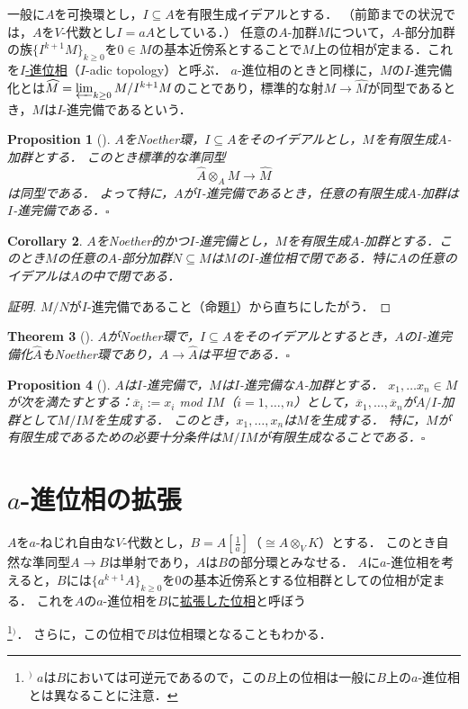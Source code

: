 \documentclass[a4paper,12pt, dvipdfmx]{jsbook}
\def\ovl#1{\overline{#1}}%
\theoremstyle{plain}
\newtheorem{thm}{\bfseries Theorem}[section]
\newtheorem{prop}[thm]{\bfseries Proposition}
\newtheorem{cor}[thm]{\bfseries Corollary}
\theoremstyle{definition}
\newcounter{chushaku}
\def\chu#1{\addtocounter{chushaku}{1}\footnote[\value{chushaku}]{${}^)$ #1}${}^)$}
\begin{document}
一般に$A$を可換環とし，$I\subseteq A$を有限生成イデアルとする．
（前節までの状況では，$A$を$V$-代数とし$I=aA$としている．）
任意の$A$-加群$M$について，$A$-部分加群の族$\{I^{k+1}M\}_{k\geq 0}$を$0\in M$の基本近傍系とすることで$M$上の位相が定まる．これを\underline{$I$-進位相}（$I$-adic topology）と呼ぶ．
$a$-進位相のときと同様に，$M$の$I$-進完備化とは$\widehat{M}=\varprojlim_{k\geq 0}M/I^{k+1}M$のことであり，標準的な射$M\rightarrow\widehat{M}$が同型であるとき，$M$は$I$-進完備であるという．
\begin{prop}[{\cite[Prop.\ 10.13]{AM}}]\label{prop-finitemodulecomplete}{\rm 
$A$をNoether環，$I\subseteq A$をそのイデアルとし，$M$を有限生成$A$-加群とする．
このとき標準的な準同型
$$
\widehat{A}\otimes_AM\longrightarrow\widehat{M}
$$
は同型である．
よって特に，$A$が$I$-進完備であるとき，任意の有限生成$A$-加群は$I$-進完備である．}\hfill$\square$
\end{prop}

\begin{cor}\label{cor-finitemodulecomplete}{\rm 
$A$をNoether的かつ$I$-進完備とし，$M$を有限生成$A$-加群とする．このとき$M$の任意の$A$-部分加群$N\subseteq M$は$M$の$I$-進位相で閉である．特に$A$の任意のイデアルは$A$の中で閉である．}
\end{cor}

\begin{proof}[証明]
$M/N$が$I$-進完備であること（命題\ref{prop-finitemodulecomplete}）から直ちにしたがう．
\end{proof}

\begin{thm}[{\cite[Prop.\ 10.14, Theorem 10.26]{AM}}]\label{thm-completionnoetherian}{\rm 
$A$がNoether環で，$I\subseteq A$をそのイデアルとするとき，$A$の$I$-進完備化$\widehat{A}$もNoether環であり，$A\rightarrow\widehat{A}$は平坦である．}\hfill$\square$
\end{thm}

\begin{prop}[{\cite[Theorem 8.4]{Matsu}}]\label{prop-completeseparatedfiniteness}{\rm 
$A$は$I$-進完備で，$M$は$I$-進完備な$A$-加群とする．
$x_1,\ldots x_n\in M$が次を満たすとする：$\ovl{x}_i:=x_i$ mod $IM$（$i=1,\ldots,n$）として，$\ovl{x}_1,\ldots,\ovl{x}_n$が$A/I$-加群として$M/IM$を生成する．
このとき，$x_1,\ldots,x_n$は$M$を生成する．
特に，$M$が有限生成であるための必要十分条件は$M/IM$が有限生成なることである．}\hfill$\square$
\end{prop}

\section{$a$-進位相の拡張}\label{sec-extensionadictopologies}
$A$を$a$-ねじれ自由な$V$-代数とし，$B=A[\frac{1}{a}]$（$\cong A\otimes_VK$）とする．
このとき自然な準同型$A\rightarrow B$は単射であり，$A$は$B$の部分環とみなせる．
$A$に$a$-進位相を考えると，$B$には$\{a^{k+1}A\}_{k\geq 0}$を$0$の基本近傍系とする位相群としての位相が定まる．
これを$A$の$a$-進位相を$B$に\underline{拡張した位相}と呼ぼう\chu{$a$は$B$においては可逆元であるので，この$B$上の位相は一般に$B$上の$a$-進位相とは異なることに注意．}．
さらに，この位相で$B$は位相環となることもわかる．
\end{document}
